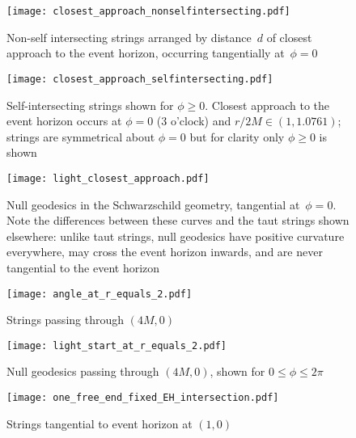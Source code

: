 \documentclass[review]{elsarticle}
\begin{document}
\begin{figure}[p] %
\centering
\texttt{[image: closest\_approach\_nonselfintersecting.pdf]}
\caption{Non-self intersecting strings arranged by distance~$d$ of
  closest approach to the event horizon, occurring tangentially
  at~$\phi=0$}
\label{closest_approach_non_self_intersecting}
\end{figure}

\begin{figure}[p] %
\centering
\texttt{[image: closest\_approach\_selfintersecting.pdf]}
\caption{Self-intersecting strings shown for $\phi\geqslant 0$.  Closest
  approach to the event horizon occurs at $\phi=0$ (3 o'clock) and
  $r/2M\in\left(1,1.0761\right)$; strings are symmetrical about $\phi=0$
  but for clarity only $\phi\geqslant 0$ is shown}
\label{closest_approach_self_intersecting}
\end{figure}

\begin{figure}[p] %
\centering
\texttt{[image: light\_closest\_approach.pdf]}

\caption{Null geodesics in the Schwarzschild geometry, tangential
  at~$\phi=0$.  Note the differences between these curves and the taut
  strings shown elsewhere: unlike taut strings, null geodesics have
  positive curvature everywhere, may cross the event horizon inwards,
  and are never tangential to the event horizon}
\label{light_closest_approach}
\end{figure}

\begin{figure}[p]
\centering
\texttt{[image: angle\_at\_r\_equals\_2.pdf]} %
\caption{Strings passing through $(4M,0)$}
\label{strings_r_equals_2}
\end{figure}

\begin{figure}[p]
\centering
\texttt{[image: light\_start\_at\_r\_equals\_2.pdf]} %
\caption{Null geodesics passing through $(4M,0)$, shown for
  $0\leqslant\phi\leqslant 2\pi$}
\label{light_r_equals_2}
\end{figure}

\begin{figure}[p] %
\centering
\texttt{[image: one\_free\_end\_fixed\_EH\_intersection.pdf]}
\caption{Strings tangential to event horizon at $(1,0)$}
\label{fixed_EH_intersection}
\end{figure}
\end{document}
